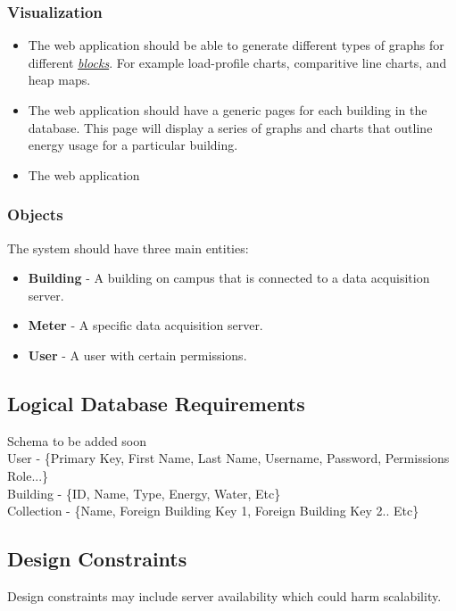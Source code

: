 \documentclass[onecolumn, draftclsnofoot,10pt, compsoc]{IEEEtran}
\begin{document}
\begin{enumerate}
\begin{itemize}
    \end{itemize}    

    \subsubsection{Visualization}
    \begin{itemize}
        \item The web application should be able to generate different types of graphs for different \hyperref[definition]{\textit{blocks}}. For example load-profile charts, comparitive line charts, and heap maps.
        \item The web application should have a generic pages for each building in the database. This page will display a series of graphs and charts that outline energy usage for a particular building.
        \item The web application 
    \end{itemize}
    \subsubsection{Objects}
        The system should have three main entities: 
        \begin{itemize}
            \item \textbf{Building} - A building on campus that is connected to a data acquisition server.
            \item \textbf{Meter} - A specific data acquisition server.
            \item \textbf{User} - A user with certain permissions.
        \end{itemize}
        
    \subsection{Logical Database Requirements}
    Schema to be added soon\\
    User - \{Primary Key, First Name, Last Name, Username, Password, Permissions Role...\} \\ 
    Building - \{ID, Name, Type, Energy, Water, Etc\}\\
    Collection - \{Name, Foreign Building Key 1, Foreign Building Key 2.. Etc\}
    
    \subsection{Design Constraints}
    Design constraints may include server availability which could harm scalability.

\end{enumerate}
\end{document}
